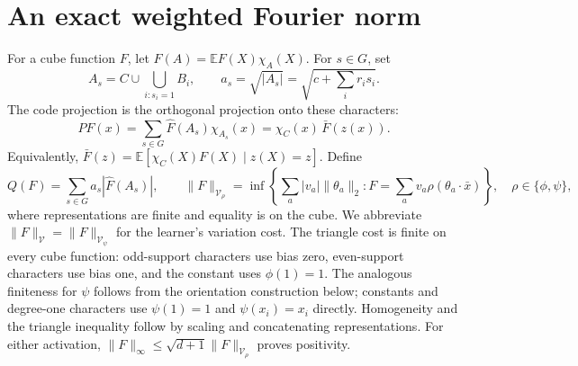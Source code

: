 \documentclass[11pt]{article}
\newcommand{\E}{\mathbb E}
\newcommand{\cV}{\mathcal V}
\begin{document}
\section{An exact weighted Fourier norm}

For a cube function $F$, let $\widehat F(A)=\E F(X)\chi_A(X)$.
For $s\in G$, set
\[
 A_s=C\cup\bigcup_{i:s_i=1}B_i,\qquad
 a_s=\sqrt{|A_s|}=\sqrt{c+\sum_i r_i s_i}.
\]
The code projection is the orthogonal projection onto these characters:
\begin{equation}\label{eq:projection}
 PF(x)=\sum_{s\in G}\widehat F(A_s)\chi_{A_s}(x)
      =\chi_C(x)\,\bar F(z(x)).
\end{equation}
Equivalently,
$\bar F(z)=\E[\chi_C(X)F(X)\mid z(X)=z]$.
Define
\[
 Q(F)=\sum_{s\in G}a_s|\widehat F(A_s)|,
 \qquad
 \|F\|_{\cV_\rho}=\inf\left\{\sum_a|v_a|\|\theta_a\|_2:
          F=\sum_a v_a\rho(\theta_a\cdot\bar x)\right\},
 \quad \rho\in\{\phi,\psi\},
\]
where representations are finite and equality is on the cube.
We abbreviate $\|F\|_{\cV}=\|F\|_{\cV_\psi}$ for the learner's
variation cost. The triangle cost is finite on every cube function:
odd-support characters use bias zero, even-support characters use bias
one, and the constant uses $\phi(1)=1$. The analogous finiteness for
$\psi$ follows from the orientation construction below; constants and
degree-one characters use $\psi(1)=1$ and $\psi(x_i)=x_i$ directly.
Homogeneity and the triangle inequality follow by scaling and
concatenating representations. For either activation,
$\|F\|_\infty\le\sqrt{d+1}\|F\|_{\cV_\rho}$ proves positivity.
\end{document}
